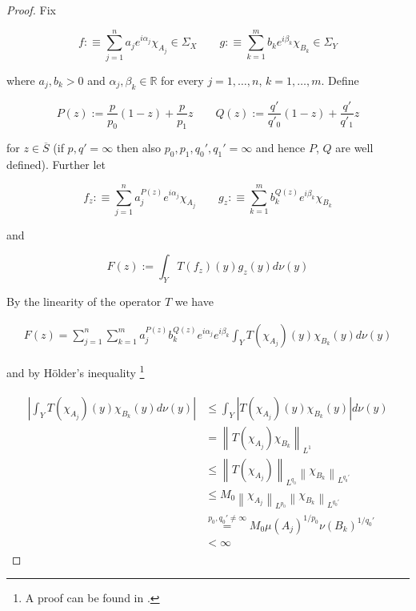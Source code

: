 \begin{proof}
Fix 
	
\begin{equation*}
	f :\equiv \sum_{j = 1}^n a_j e^{i\alpha_j}\chi_{A_j} \in \Sigma_X \qquad g :\equiv \sum_{k = 1}^m b_k e^{i\beta_k}\chi_{B_k} \in \Sigma_Y
\end{equation*}

	where $a_j, b_k > 0$ and $\alpha_j, \beta_k \in \mathbb{R}$ for every $j = 1,\hdots,n$, $k = 1,\hdots,m$. Define

\begin{equation*}
	P(z) := \frac{p}{p_0}(1 - z) + \frac{p}{p_1}z \qquad Q(z) := \frac{q'}{q'_0}(1 - z) + \frac{q'}{q'_1}z
\end{equation*}

	for $z \in \overline{S}$ (if $p,q' = \infty$ then also $p_0,p_1,q_0',q_1' = \infty $ and hence $P$, $Q$ are well defined). Further let
				
\begin{equation}
	f_z :\equiv \sum_{j = 1}^n a^{P(z)}_j e^{i\alpha_j}\chi_{A_j} \qquad g_z :\equiv  \sum_{k = 1}^m b^{Q(z)}_k e^{i\beta_k}\chi_{B_k}
	\label{def:fzgz}
\end{equation}
				
and 

\begin{equation}
	F(z) := \int_Y T(f_z)(y)g_z(y)d\nu(y)
	\label{eq:def_F}
\end{equation}

By the linearity of the operator $T$ we have

\begin{gather*}
	F(z) = \sum_{j = 1}^n\sum_{k = 1}^m a^{P(z)}_j b_k^{Q(z)} e^{i\alpha_j} e^{i\beta_k} \int_YT(\chi_{A_j})(y)\chi_{B_k}(y)d\nu(y) 
\end{gather*}

and by H\"older's inequality \footnote{A proof can be found in \cite[223]{elstrodt:mass:2011}.}

\begin{gather*}
	\begin{aligned}
		\left| \int_YT(\chi_{A_j})(y)\chi_{B_k}(y)d\nu(y) \right| &\leqslant \int_Y\left| T(\chi_{A_j})(y)\chi_{B_k}(y)\right|d\nu(y)\\
		&= \left\|T(\chi_{A_j})\chi_{B_k}\right\|_{L^1}\\
		&\leqslant \left\|T(\chi_{A_j})\right\|_{L^{q_0}} \left\|\chi_{B_k}\right\|_{L^{q_0'}}\\
		&\leqslant M_0\left\|\chi_{A_j}\right\|_{L^{p_0}} \left\|\chi_{B_k}\right\|_{L^{q_0'}}\\
		&\overset{p_0,q_0' \neq \infty}{=} M_0\mu\left(A_j\right)^{1/p_0} \nu\left(B_k\right)^{1/q_0'}\\ 
		&< \infty
	\end{aligned}
\end{gather*}


\end{proof}

